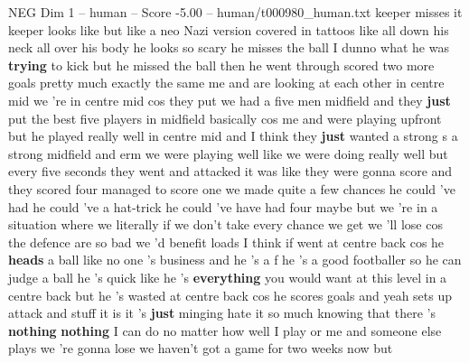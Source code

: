 \begin{textsample}{NEG Dim 1 – human – Score -5.00 – human/t000980\_human.txt}  \label{ex:f1_neg_038}
keeper misses it keeper looks like but like a neo Nazi version covered in tattoos like all down his neck all over his body he looks so scary he misses the ball I dunno what he was \textbf{trying} to kick but he missed the ball then he went through scored two more goals pretty much exactly the same me and are looking at each other in centre mid we 're in centre mid cos they put we had a five men midfield and they \textbf{just} put the best five players in midfield basically cos me and were playing upfront but he played really well in centre mid and I think they \textbf{just} wanted a strong s a strong midfield and erm we were playing well like we were doing really well but every five seconds they went and attacked it was like they were gonna score and they scored four managed to score one we made quite a few chances he could 've had he could 've a hat-trick he could 've have had four maybe but we 're in a situation where we literally if we don't take every chance we get we 'll lose cos the defence are so bad we 'd benefit loads I think if went at centre back cos he \textbf{heads} a ball like no one 's business and he 's a f he 's a good footballer so he can judge a ball he 's quick like he 's \textbf{everything} you would want at this level in a centre back but he 's wasted at centre back cos he scores goals and yeah sets up attack and stuff it is it 's \textbf{just} minging hate it so much knowing that there 's \textbf{nothing} \textbf{nothing} I can do no matter how well I play or me and someone else plays we 're gonna lose we haven't got a game for two weeks now but

\end{textsample}

